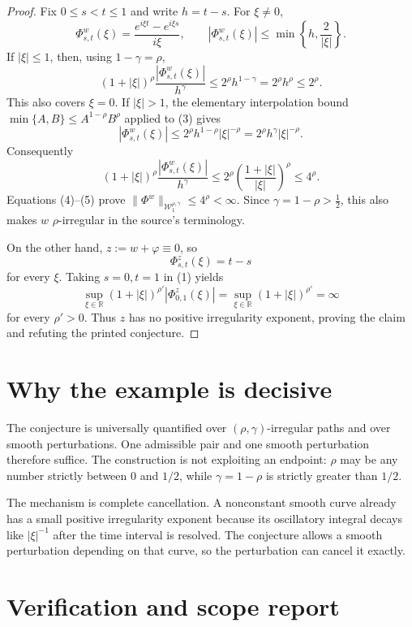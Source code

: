 \documentclass[11pt]{article}
\newcommand{\R}{\mathbb R}
\newcommand{\W}{\mathcal W}
\begin{document}
\begin{proof}
Fix $0\le s<t\le1$ and write $h=t-s$. For $\xi\ne0$,
\[
 \Phi^w_{s,t}(\xi)
   =\frac{e^{i\xi t}-e^{i\xi s}}{i\xi},
 \qquad
 |\Phi^w_{s,t}(\xi)|\le \min\!\left\{h,\frac2{|\xi|}\right\}. \tag{3}
\]
If $|\xi|\le1$, then, using $1-\gamma=\rho$,
\[
 (1+|\xi|)^\rho\frac{|\Phi^w_{s,t}(\xi)|}{h^\gamma}
 \le 2^\rho h^{1-\gamma}=2^\rho h^\rho\le2^\rho.               \tag{4}
\]
This also covers $\xi=0$. If $|\xi|>1$, the elementary interpolation bound
$\min\{A,B\}\le A^{1-\rho}B^\rho$ applied to (3) gives
\[
 |\Phi^w_{s,t}(\xi)|
 \le 2^\rho h^{1-\rho}|\xi|^{-\rho}
 =2^\rho h^\gamma|\xi|^{-\rho}.
\]
Consequently
\[
 (1+|\xi|)^\rho\frac{|\Phi^w_{s,t}(\xi)|}{h^\gamma}
 \le 2^\rho\left(\frac{1+|\xi|}{|\xi|}\right)^\rho
 \le4^\rho.                                                     \tag{5}
\]
Equations (4)--(5) prove
$\|\Phi^w\|_{\W_1^{\rho,\gamma}}\le4^\rho<\infty$. Since
$\gamma=1-\rho>\tfrac12$, this also makes $w$ $\rho$-irregular in the
source's terminology.

On the other hand, $z:=w+\varphi\equiv0$, so
\[
                       \Phi^z_{s,t}(\xi)=t-s                 \tag{6}
\]
for every $\xi$. Taking $s=0,t=1$ in (1) yields
\[
 \sup_{\xi\in\R}(1+|\xi|)^{\rho'}|\Phi^z_{0,1}(\xi)|
 =\sup_{\xi\in\R}(1+|\xi|)^{\rho'}=\infty
\]
for every $\rho'>0$. Thus $z$ has no positive irregularity exponent, proving
the claim and refuting the printed conjecture.
\end{proof}

\section{Why the example is decisive}

The conjecture is universally quantified over $(\rho,\gamma)$-irregular
paths and over smooth perturbations. One admissible pair and one smooth
perturbation therefore suffice. The construction is not exploiting an endpoint:
$\rho$ may be any number strictly between $0$ and $1/2$, while
$\gamma=1-\rho$ is strictly greater than $1/2$.

The mechanism is complete cancellation. A nonconstant smooth curve already
has a small positive irregularity exponent because its oscillatory integral
decays like $|\xi|^{-1}$ after the time interval is resolved. The conjecture
allows a smooth perturbation depending on that curve, so the perturbation can
cancel it exactly.

\section{Verification and scope report}
\end{document}
